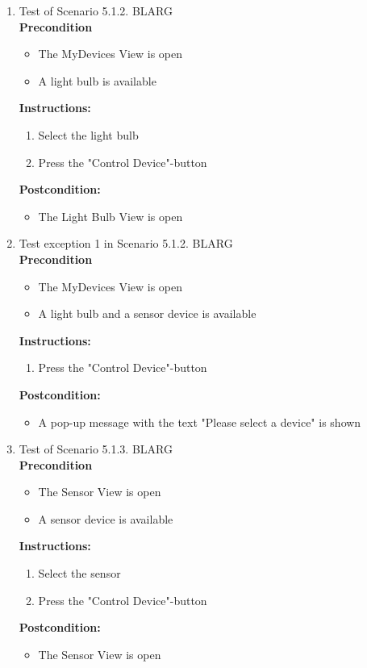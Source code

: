 \documentclass[a4paper]{article}
\newlength{\testlabellength}
\newenvironment{testlist}{\begin{enumerate}[label=\bfseries Instruction \thesubsection.\arabic* , labelindent=0pt, labelwidth=\testlabellength , leftmargin=2cm]}{\end{enumerate}}
\newenvironment{precondition}{
{\color{white}BLARG}\\ 
\textbf{Precondition}
\begin{itemize}[labelindent=0cm, labelwidth=2cm , leftmargin=1cm]
}
{\end{itemize}}
\newenvironment{instruction}{
\textbf{Instructions:}
\begin{enumerate}[label=\bfseries  \arabic*., labelindent=0cm, labelwidth=2cm , leftmargin=1cm]
}
{\end{enumerate}}
\newenvironment{postcondition}{
\textbf{Postcondition:}
\begin{itemize}[labelindent=0cm, labelwidth=2cm , leftmargin=1cm]
}
{\end{itemize}}
\begin{document}
\begin{appendices}
\begin{testlist}
	\item Test of Scenario 5.1.2. 
		\begin{precondition}
			\item The MyDevices View is open
			\item A light bulb is available
		\end{precondition}
		\begin{instruction}
			\item Select the light bulb
			\item Press the "Control Device"-button
		\end{instruction}
		\begin{postcondition}
			\item The Light Bulb View is open
		\end{postcondition}

	\item Test exception 1 in Scenario 5.1.2. \label{SystemTest1}
		\begin{precondition}
			\item The MyDevices View is open
			\item A light bulb and a sensor device is available
		\end{precondition}
		\begin{instruction}
			\item Press the "Control Device"-button
		\end{instruction}
		\begin{postcondition}
			\item A pop-up message with the text "Please select a device" is shown
		\end{postcondition}	

	\item Test of Scenario 5.1.3.
		\begin{precondition}
			\item The Sensor View is open
			\item A sensor device is available
		\end{precondition}
		\begin{instruction}
			\item Select the sensor
			\item Press the "Control Device"-button
		\end{instruction}
		\begin{postcondition}
			\item The Sensor View is open
		\end{postcondition}



\end{testlist}
\end{appendices}
\end{document}
